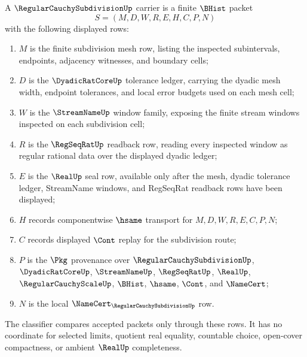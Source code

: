 \begin{definition}
\label{def:regular-cauchy-subdivision-carrier}
A $\RegularCauchySubdivisionUp$ carrier is a finite $\BHist$ packet
$$
S=(M,D,W,R,E,H,C,P,N)
$$
with the following displayed rows:
\begin{enumerate}
\item $M$ is the finite subdivision mesh row, listing the inspected subintervals, endpoints, adjacency witnesses, and boundary cells;
\item $D$ is the $\DyadicRatCoreUp$ tolerance ledger, carrying the dyadic mesh width, endpoint tolerances, and local error budgets used on each mesh cell;
\item $W$ is the $\StreamNameUp$ window family, exposing the finite stream windows inspected on each subdivision cell;
\item $R$ is the $\RegSeqRatUp$ readback row, reading every inspected window as regular rational data over the displayed dyadic ledger;
\item $E$ is the $\RealUp$ seal row, available only after the mesh, dyadic tolerance ledger, StreamName windows, and RegSeqRat readback rows have been displayed;
\item $H$ records componentwise $\hsame$ transport for $M,D,W,R,E,C,P,N$;
\item $C$ records displayed $\Cont$ replay for the subdivision route;
\item $P$ is the $\Pkg$ provenance over $\RegularCauchySubdivisionUp$, $\DyadicRatCoreUp$, $\StreamNameUp$, $\RegSeqRatUp$, $\RealUp$, $\RegularCauchyScaleUp$, $\BHist$, $\hsame$, $\Cont$, and $\NameCert$;
\item $N$ is the local $\NameCert_{\RegularCauchySubdivisionUp}$ row.
\end{enumerate}
The classifier compares accepted packets only through these rows. It has no coordinate for selected limits, quotient real equality, countable choice, open-cover compactness, or ambient $\RealUp$ completeness.
\end{definition}

